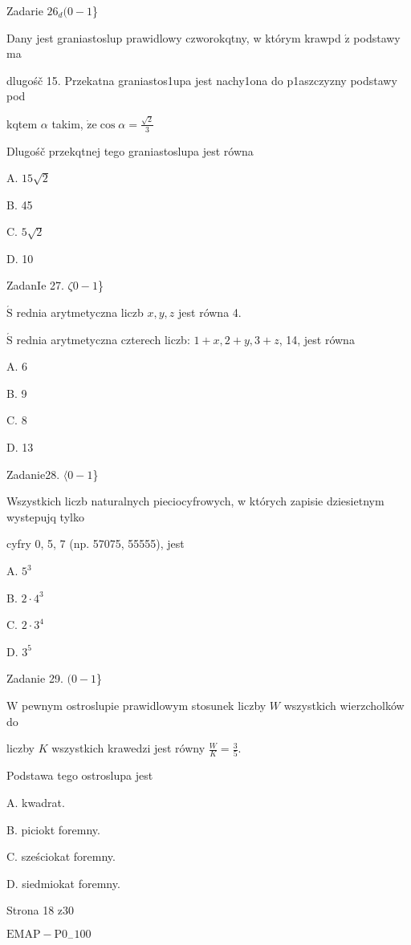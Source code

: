 \documentclass[a4paper,12pt]{article}
\begin{document}
Zadarie $26_{d}(0-1$\}

Dany jest graniastoslup prawidlowy czworokqtny, w którym krawpd $\acute{\mathrm{z}}$ podstawy ma

dlugośč 15. Przekatna graniastos1upa jest nachy1ona do p1aszczyzny podstawy pod

kqtem $\alpha$ takim, $\dot{\mathrm{z}}\mathrm{e} \displaystyle \cos\alpha=\frac{\sqrt{2}}{3}$

Dlugośč przekqtnej tego graniastoslupa jest równa

A. $15\sqrt{2}$

B. 45

C. $5\sqrt{2}$

D. 10

ZadanIe 27. $\zeta 0-1$\}

$\acute{\mathrm{S}}$ rednia arytmetyczna liczb $x, y, z$ jest równa 4.

$\acute{\mathrm{S}}$ rednia arytmetyczna czterech liczb: $1+x, 2+y, 3+z$, 14, jest równa

A. 6

B. 9

C. 8

D. 13

Zadanie28. $\langle 0-1$\}

Wszystkich liczb naturalnych pieciocyfrowych, w których zapisie dziesietnym wystepujq tylko

cyfry 0, 5, 7 (np. 57075, 55555), jest

A. $5^{3}$

B. $2\cdot 4^{3}$

C. $2\cdot 3^{4}$

D. $3^{5}$

Zadanie 29. $(0-1$\}

$\mathrm{W}$ pewnym ostroslupie prawidlowym stosunek liczby $W$ wszystkich wierzcholków do

liczby $K$ wszystkich krawedzi jest równy $\displaystyle \frac{W}{K}=\frac{3}{5}.$

Podstawa tego ostroslupa jest

A. kwadrat.

B. piciokt foremny.

C. sześciokat foremny.

D. siedmiokat foremny.

Strona 18 z30

$\mathrm{E}\mathrm{M}\mathrm{A}\mathrm{P}-\mathrm{P}0_{-}100$
\end{document}
